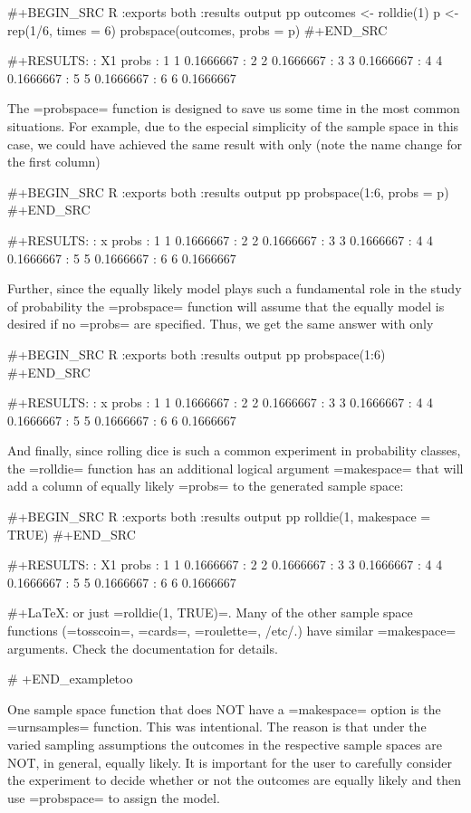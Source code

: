 #+BEGIN_SRC R :exports both :results output pp   
outcomes <- rolldie(1) 
p <- rep(1/6, times = 6) 
probspace(outcomes, probs = p) 
#+END_SRC

#+RESULTS:
:   X1     probs
: 1  1 0.1666667
: 2  2 0.1666667
: 3  3 0.1666667
: 4  4 0.1666667
: 5  5 0.1666667
: 6  6 0.1666667

The =probspace= function is designed to save us some time in the most
common situations. For example, due to the especial simplicity of the
sample space in this case, we could have achieved the same result with
only (note the name change for the first column)

#+BEGIN_SRC R :exports both :results output pp   
probspace(1:6, probs = p) 
#+END_SRC 

#+RESULTS:
:   x     probs
: 1 1 0.1666667
: 2 2 0.1666667
: 3 3 0.1666667
: 4 4 0.1666667
: 5 5 0.1666667
: 6 6 0.1666667

Further, since the equally likely model plays such a fundamental role
in the study of probability the =probspace= function will assume that
the equally model is desired if no =probs= are specified. Thus, we get
the same answer with only

#+BEGIN_SRC R :exports both :results output pp   
probspace(1:6) 
#+END_SRC 

#+RESULTS:
:   x     probs
: 1 1 0.1666667
: 2 2 0.1666667
: 3 3 0.1666667
: 4 4 0.1666667
: 5 5 0.1666667
: 6 6 0.1666667

And finally, since rolling dice is such a common experiment in
probability classes, the =rolldie= function has an additional logical
argument =makespace= that will add a column of equally likely =probs=
to the generated sample space:

#+BEGIN_SRC R :exports both :results output pp   
rolldie(1, makespace = TRUE)
#+END_SRC

#+RESULTS:
:   X1     probs
: 1  1 0.1666667
: 2  2 0.1666667
: 3  3 0.1666667
: 4  4 0.1666667
: 5  5 0.1666667
: 6  6 0.1666667

#+LaTeX: \noindent 
or just =rolldie(1, TRUE)=. Many of the other sample space functions
(=tosscoin=, =cards=, =roulette=, /etc/.) have similar =makespace=
arguments. Check the documentation for details.

# +END_exampletoo


One sample space function that does NOT have a =makespace= option is
the =urnsamples= function. This was intentional. The reason is that
under the varied sampling assumptions the outcomes in the respective
sample spaces are NOT, in general, equally likely. It is important for
the user to carefully consider the experiment to decide whether or not
the outcomes are equally likely and then use =probspace= to assign the
model.

